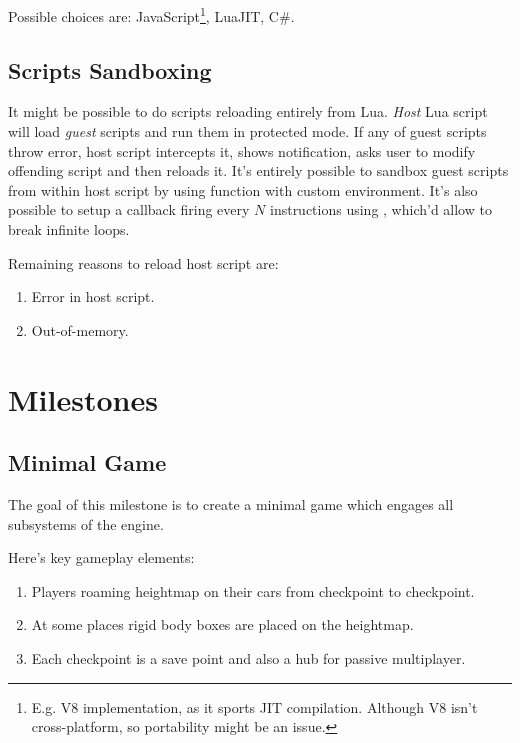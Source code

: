 \documentclass[12pt]{article}
\newcommand{\mylstinline}[2]{\fbox{\lstinline[language=#1]{#2}}}
\begin{document}
Possible choices are:
JavaScript\footnote{
    E.g. V8 implementation, as it sports JIT compilation.
    Although V8 isn't cross-platform, so portability might be an issue.
}, LuaJIT, C\#.

\subsection{Scripts Sandboxing}

It might be possible to do scripts reloading entirely from Lua.
\emph{Host} Lua script will load \emph{guest} scripts and run them in
protected mode.
If any of guest scripts throw error, host script intercepts it,
shows notification, asks user to modify offending script and then
reloads it.
It's entirely possible to sandbox guest scripts from within
host script by using \mylstinline{bash}{load} function with custom
environment.
It's also possible to setup a callback firing every \(N\) instructions
using \mylstinline{bash}{debug.sethook}, which'd allow to break
infinite loops.

Remaining reasons to reload host script are:

\begin{enumerate}
    \item Error in host script.
    \item Out-of-memory.
\end{enumerate}

\section{Milestones}

\subsection{Minimal Game}

The goal of this milestone is to create a minimal game which engages all
subsystems of the engine.

Here's key gameplay elements:
\begin{enumerate}
    \item
        Players roaming heightmap on their cars from checkpoint to checkpoint.
    \item
        At some places rigid body boxes are placed on the heightmap.
    \item
        Each checkpoint is a save point and also a hub for passive multiplayer.
\end{enumerate}
\end{document}
